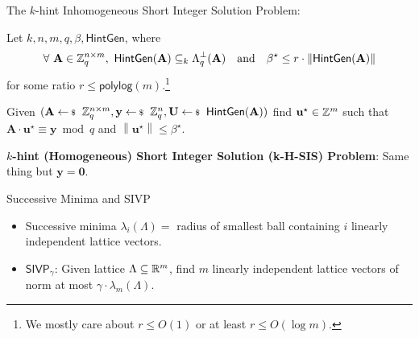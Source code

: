\documentclass[xcolor=table,10pt,aspectratio=169]{beamer}
\renewcommand{\vec}[1]{\ensuremath{\mathbf{#1}}\xspace}
\newcommand{\norm}[1]{\left\lVert#1\right\rVert}
\providecommand{\mat}[1]{\ensuremath{\vec{#1}}\xspace}
\newcommand{\SIVP}{\ensuremath{\mathsf{SIVP}}\xspace}
\begin{document}
\begin{frame}[label={sec:org3df4190}]{The \(k\)-hint Inhomogeneous Short Integer Solution Problem:}
\begin{definition}[k-H-ISIS]
Let \(k,n,m,q,\beta,\mathsf{HintGen}\), where
\[\begin{aligned}
  \forall~\mat{A} \in \ZZ_q^{n \times m},~\mathsf{HintGen}(\mat{A}) \subseteq_k \Lambda_q^\bot(\mat{A}) && \text{and} && \beta^{\star} \leq r \cdot \norm{\mathsf{HintGen}(\mat{A})}          
  \end{aligned}
\]
for some ratio \(r \leq \mathsf{polylog}(m)\).\footnote{We mostly care about \(r \leq O(1)\) or at least \(r \leq O(\log m)\).}

Given \((\mat{A} \sample \ZZ_q^{n \times m}, \vec{y} \sample \ZZ_q^n, \mat{U} \sample \mathsf{HintGen}(\mat{A}))\) find
\(\vec{u}^{\star} \in \ZZ^m\) such that \(\mat{A} \cdot\vec{u}^{\star} \equiv \vec{y} \bmod q\) and \(\norm{\vec{u}^\star} \leq \beta^{\star}\).
\label{def:khISIS}
\end{definition}

\textbf{\(k\)-hint (Homogeneous) Short Integer Solution (k-H-SIS) Problem}: Same thing but \(\vec{y} = \vec{0}\).
\end{frame}

\begin{frame}[label={sec:orgfd5a52a}]{Successive Minima and SIVP}
\begin{itemize}
\item Successive minima \(\lambda_i(\Lambda) =\) radius of smallest ball containing \(i\) linearly independent lattice vectors.

\item \(\SIVP_\gamma\): Given lattice \(\Lambda \subseteq \mathbb{R}^m\), find \(m\) linearly independent lattice vectors of norm at most \(\gamma \cdot \lambda_m(\Lambda)\).
\end{itemize}
\end{frame}
\end{document}
